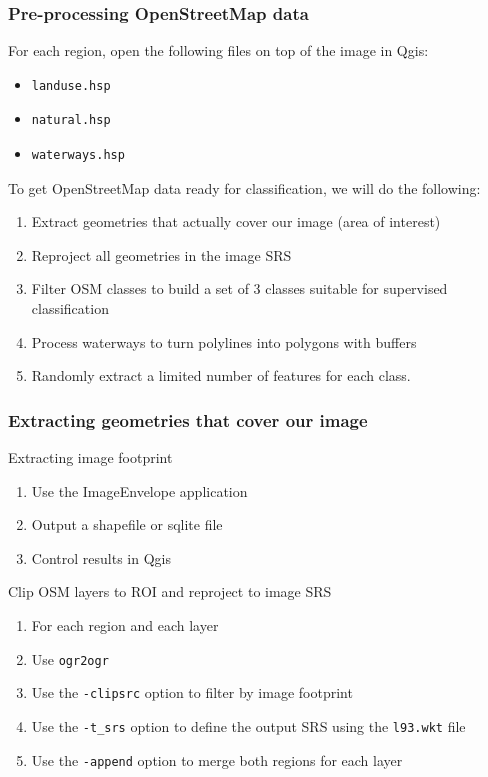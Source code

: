 \documentclass[8pt]{beamer}
\begin{document}
\begin{frame}[fragile]
\frametitle{Pre-processing OpenStreetMap data}

For each region, open the following files on top of the image in Qgis:
\begin{itemize}
\item \begin{verbatim}landuse.hsp\end{verbatim}
\item \begin{verbatim}natural.hsp\end{verbatim}
\item \begin{verbatim}waterways.hsp\end{verbatim}
\end{itemize}

To get OpenStreetMap data ready for classification, we will do the following:
\begin{enumerate}
\item Extract geometries that actually cover our image (area of interest)
\item Reproject all geometries in the image SRS
\item Filter OSM classes to build a set of 3 classes suitable for supervised classification
\item Process waterways to turn polylines into polygons with buffers
\item Randomly extract a limited number of features for each class.
\end{enumerate}
\end{frame}

\begin{frame}[fragile]
\frametitle{Extracting geometries that cover our image}
\begin{block}{Extracting image footprint}
\begin{enumerate}
\item Use the ImageEnvelope application
\item Output a shapefile or sqlite file
\item Control results in Qgis
\end{enumerate}
\end{block}

\begin{block}{Clip OSM layers to ROI and reproject to image SRS}
\begin{enumerate}
\item For each region and each layer
\item Use \texttt{ogr2ogr}
\item Use the \texttt{-clipsrc} option to filter by image footprint
\item Use the \texttt{-t\_srs} option to define the output SRS using the \texttt{l93.wkt} file
\item Use the \texttt{-append} option to merge both regions for each layer
\end{enumerate}
\end{block}

\end{frame}
\end{document}
